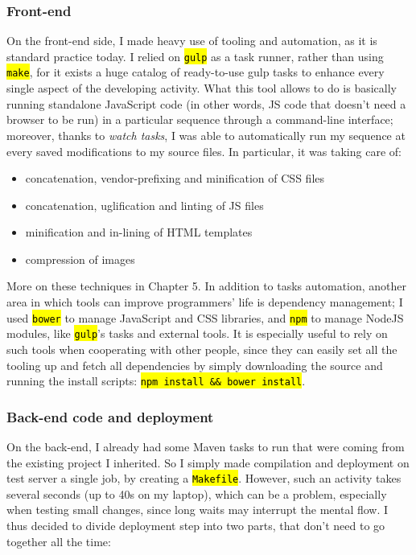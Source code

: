 \documentclass[12pt,oneside,svgnames]{memoir}
\let\OldTexttt\texttt
\renewcommand{\texttt}[1]{\OldTexttt{\hl{#1}}}
\begin{document}
\subsubsection*{Front-end}\label{front-end}

On the front-end side, I made heavy use of tooling and automation, as it
is standard practice today. I relied on \texttt{gulp} as a task runner,
rather than using \texttt{make}, for it exists a huge catalog of
ready-to-use gulp tasks to enhance every single aspect of the developing
activity. What this tool allows to do is basically running standalone
JavaScript code (in other words, JS code that doesn't need a browser to
be run) in a particular sequence through a command-line interface;
moreover, thanks to \emph{watch tasks}, I was able to automatically run
my sequence at every saved modifications to my source files. In
particular, it was taking care of:

\begin{itemize}
\itemsep1pt\parskip0pt
\item
  concatenation, vendor-prefixing and minification of CSS files
\item
  concatenation, uglification and linting of JS files
\item
  minification and in-lining of HTML templates
\item
  compression of images
\end{itemize}

More on these techniques in Chapter 5. In addition to tasks automation,
another area in which tools can improve programmers' life is dependency
management; I used \texttt{bower} to manage JavaScript and CSS
libraries, and \texttt{npm} to manage NodeJS modules, like
\texttt{gulp}'s tasks and external tools. It is especially useful to
rely on such tools when cooperating with other people, since they can
easily set all the tooling up and fetch all dependencies by simply
downloading the source and running the install scripts:
\texttt{npm install \&\& bower install}.

\subsubsection*{Back-end code and
deployment}\label{back-end-code-and-deployment}

On the back-end, I already had some Maven tasks to run that were coming
from the existing project I inherited. So I simply made compilation and
deployment on test server a single job, by creating a \texttt{Makefile}.
However, such an activity takes several seconds (up to 40s on my
laptop), which can be a problem, especially when testing small changes,
since long waits may interrupt the mental flow. I thus decided to divide
deployment step into two parts, that don't need to go together all the
time:
\end{document}
